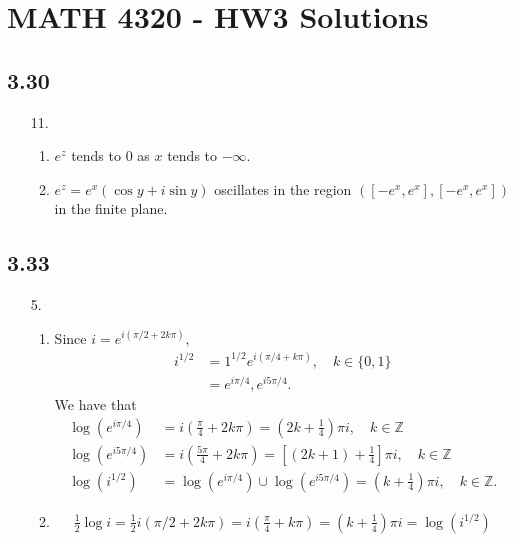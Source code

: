 \documentclass[a4paper,12pt]{article}
\begin{document}
\section*{MATH 4320 - HW3 Solutions}
\subsection*{3.30}
\begin{enumerate}
    \item[11.]
        \begin{enumerate}
            \item
                $e^z$ tends to $0$ as $x$ tends to $-\infty$.

            \item
                $e^z = e^x (\cos y + i \sin y)$ oscillates in the region $([-e^x, e^x], [-e^x, e^x])$ in the finite plane.
        \end{enumerate}
\end{enumerate}

\subsection*{3.33}
\begin{enumerate}
    \item[5.]
        \begin{enumerate}
            \item
                Since $i = e^{i(\pi/2 + 2k\pi)}$,
                \begin{align*}
                    i^{1/2} &= 1^{1/2} e^{i(\pi/4 + k\pi)}, \quad k \in \{ 0, 1 \} \\
                    &= e^{i\pi/4}, e^{i5\pi/4}.
                \end{align*}
                We have that
                \begin{align*}
                    \log(e^{i\pi/4}) &= i \left( \frac{\pi}{4} + 2k\pi \right) = \left( 2k + \frac{1}{4} \right) \pi i, \quad k \in \mathbb{Z} \\
                    \log(e^{i5\pi/4}) &= i \left( \frac{5\pi}{4} + 2k\pi \right) = \left[ (2k + 1) + \frac{1}{4} \right] \pi i, \quad k \in \mathbb{Z} \\
                    \log(i^{1/2}) &= \log(e^{i\pi/4}) \cup \log(e^{i5\pi/4}) = \left( k + \frac{1}{4} \right) \pi i, \quad k \in \mathbb{Z}.
                \end{align*}

            \item
                \begin{align*}
                    \frac{1}{2} \log i = \frac{1}{2} i (\pi/2 + 2k\pi) = i \left( \frac{\pi}{4} + k\pi \right) = \left( k + \frac{1}{4} \right) \pi i = \log(i^{1/2})
                \end{align*}

        \end{enumerate}

\end{enumerate}
\end{document}
